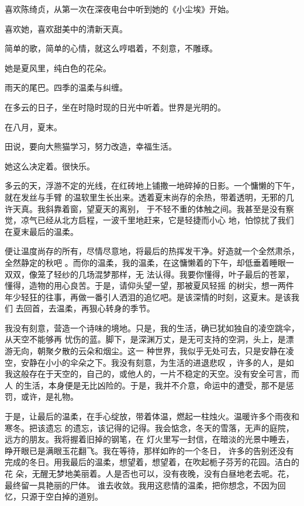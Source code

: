 \documentclass[12pt,a4paper]{article}
\begin{document}
		喜欢陈绮贞，从第一次在深夜电台中听到她的《小尘埃》开始。\par
		喜欢她，喜欢甜美中的清新天真。\par
		简单的歌，简单的心情，就这么哼唱着，不刻意，不雕琢。\par
		她是夏风里，纯白色的花朵。

		雨天的尾巴。四季的温柔与纠缠。\par
		在多云的日子，坐在时隐时现的日光中听着。世界是光明的。\par
		在八月，夏末。

		田说，要向大熊猫学习，努力改造，幸福生活。\par
		她这么决定着。很快乐。

	\endwriting



		多云的天，浮游不定的光线，在红砖地上铺撒一地碎掉的日影。一个慵懒的下午，就在发丝与手臂
	的温软里生长出来。透着夏末尚存的余热，带着透明，无邪的几许天真。我斜靠着窗，望夏天的离别，
	于不轻不重的体触之间。我甚至是没有察觉，凉气已经从北方启程，一波千里地赶来，它是轻捷而小心
	地，怕惊扰了我们在夏末最后的温柔。

		便让温度尚存的所有，尽情尽意地，将最后的热挥发干净。好造就一个全然肃杀，全然静定的秋吧
	。而你的温柔，我的温柔，在这慵懒着的下午，却低垂着睡眼一双双，像笼了轻纱的几场混梦那样，无
	法认得。我要你懂得，叶子最后的苍翠，懂得，造物的用心良苦。于是，请仰头望一望，那被夏风轻摇
	的树尖，想一两件年少轻狂的往事，再做一番引人洒泪的追忆吧。是该深情的时刻，这夏末。是该我们
	去回首，去温柔，再狠心转身的季节。

		我没有刻意，营造一个诗味的境地。只是，我的生活，确已犹如独自的凌空跳伞，从天空不能够再
	忧伤的蓝。脚下，是深渊万丈，是无可支持的空洞，头上，是漂游无向，朝聚夕散的云朵和烟尘。这一
	种世界，我似乎无处可去，只是安静在凌空，安静在小小的伞朵之下。我没有刻意，为生活的进退悲叹
	，许多的人，是如我这般存在于天空的，自己的，或他人的，一片不稳定的天空。没有安全可言，而人
	的生活，本身便是无比凶险的。于是，我并不介意，命运中的遭受，那不是惩罚，或许，是礼物。

		于是，让最后的温柔，在手心绽放，带着体温，燃起一柱烛火。温暖许多个雨夜和寒冬。把该遗忘
	的遗忘，该记得的记得。我会惦念，冬天的雪落，无声的庭院，远方的朋友。我将握着旧掉的钢笔，在
	灯火里写一封信，在暗淡的光景中睡去，睁开眼已是满眼玉花翻飞。我在等待，那样如昨的一个冬日，
	许多的告别还没有完成的冬日。用我最后的温柔，想望着，想望着，在吹起栀子芬芳的花园。洁白的花
	朵，无醒无梦地美丽着。人是否也可以，没有夜晚，没有白昼地老去呢。花，最终留一具艳丽的尸体。
	谁去收敛。我用这悲情的温柔，把你想念，不因为回忆，只源于空白掉的道别。
\end{document}
